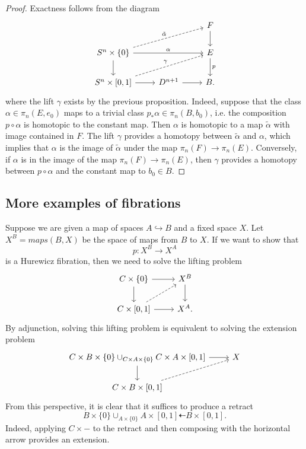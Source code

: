 \documentclass{article}
\newtheorem{proposed work}[theorem]{Proposed Work}
\theoremstyle{definition}
\begin{document}
\begin{proof}
Exactness follows from the diagram
\[
\begin{tikzcd}
 && F \arrow[d] \\
S^n \times \{0\} \arrow[dashed,urr,"\tilde{\alpha}"] \arrow[rr,"\alpha"] \arrow[d] & &E \arrow[d,"p"] \\
S^n \times [0,1] \arrow[r] \arrow[dashed, urr, "\gamma"]&D^{n+1} \arrow{r} &B.
\end{tikzcd}
\]
where the lift $\gamma$ exists by the previous proposition. Indeed, suppose that the class $\alpha \in \pi_n(E,e_0)$ maps to a trivial class $p_*\alpha \in \pi_n (B,b_0)$, i.e. the composition $p \circ \alpha$ is homotopic to the constant map. Then $\alpha$ is homotopic to a map $\tilde{\alpha}$ with image contained in $F$. The lift $\gamma$ provides a homotopy between $\tilde{\alpha}$ and $\alpha$, which implies that $\alpha$ is the image of $\tilde{\alpha}$ under the map $\pi_n(F) \to \pi_n(E)$. Conversely, if $\alpha$ is in the image of the map $\pi_n(F) \to \pi_n(E)$, then $\gamma$ provides a homotopy between $p \circ \alpha$ and the constant map to $b_0 \in B$.
\end{proof}

\subsection{More examples of fibrations}
Suppose we are given a map of spaces $A \hookrightarrow B$ and a fixed space $X$. Let $X^B = maps(B,X)$ be the space of maps from $B$ to $X$. If we want to show that
$$p : X^B \to X^A$$
is a Hurewicz fibration, then we need to solve the lifting problem
\[
\begin{tikzcd}
C \times \{0\} \arrow[r] \arrow[d] & X^B \arrow[d] \\
C \times [0,1] \arrow[r] \arrow[dashed,ur] & X^A.
\end{tikzcd}
\]
By adjunction, solving this lifting problem is equivalent to solving the extension problem
\[
\begin{tikzcd}
C \times B \times \{0 \} \cup_{C \times A \times \{0\}} C \times A \times [0,1] \arrow[r] \arrow[d] & X \\
C \times B \times [0,1] \arrow[dashed,ur]
\end{tikzcd}
\]
From this perspective, it is clear that it suffices to produce a retract
$$B \times \{0\} \cup_{A \times \{0\}} A \times [0,1] \dashleftarrow B \times [0,1].$$
Indeed, applying $C \times -$ to the retract and then composing with the horizontal arrow provides an extension. 
\end{document}
